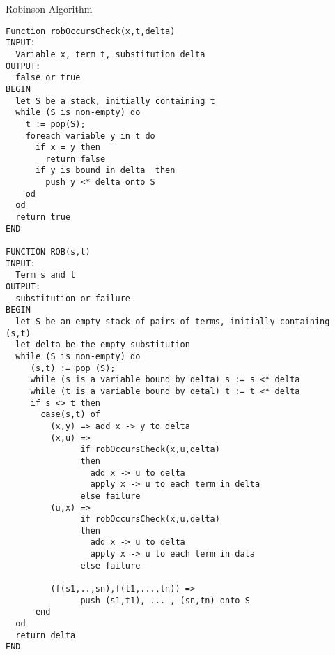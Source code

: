 Robinson Algorithm
\begin{verbatim}
Function robOccursCheck(x,t,delta)
INPUT:
  Variable x, term t, substitution delta
OUTPUT:
  false or true
BEGIN
  let S be a stack, initially containing t
  while (S is non-empty) do
    t := pop(S);
    foreach variable y in t do
      if x = y then
        return false
      if y is bound in delta  then
        push y <* delta onto S
    od 
  od
  return true
END

FUNCTION ROB(s,t)
INPUT:
  Term s and t
OUTPUT:
  substitution or failure
BEGIN
  let S be an empty stack of pairs of terms, initially containing
(s,t)
  let delta be the empty substitution
  while (S is non-empty) do
     (s,t) := pop (S);
     while (s is a variable bound by delta) s := s <* delta
     while (t is a variable bound by detal) t := t <* delta
     if s <> t then
       case(s,t) of
         (x,y) => add x -> y to delta
         (x,u) =>
               if robOccursCheck(x,u,delta)
               then
                 add x -> u to delta
                 apply x -> u to each term in delta 
               else failure
         (u,x) =>
               if robOccursCheck(x,u,delta)
               then
                 add x -> u to delta
                 apply x -> u to each term in data
               else failure

         (f(s1,..,sn),f(t1,...,tn)) =>
               push (s1,t1), ... , (sn,tn) onto S
      end     
  od
  return delta
END
\end{verbatim}
  